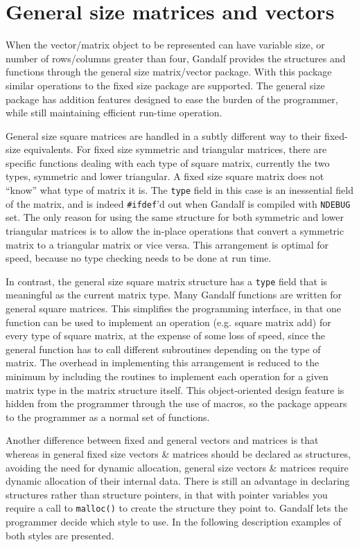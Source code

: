 \section{General size matrices and vectors} \label{general-size-sec}
When the vector/matrix object to be represented can have variable size,
or number of rows/columns greater than four, Gandalf provides the
structures and functions through the general size matrix/vector package.
With this package similar operations to the fixed size package are
supported. The general size package has addition features designed
to ease the burden of the programmer, while still maintaining efficient
run-time operation.

General size square matrices are handled in a subtly different way
to their fixed-size equivalents. For fixed size symmetric and triangular
matrices, there are specific functions dealing with each type of square
matrix, currently the two types, symmetric and lower triangular.
A fixed size square matrix does not ``know'' what type of matrix it is.
The {\tt type} field in this case is an inessential field of the matrix,
and is indeed {\tt \#ifdef}'d out when Gandalf is compiled with {\tt NDEBUG}
set. The only reason for using the same structure for both symmetric
and lower triangular matrices is to allow the in-place operations that convert
a symmetric matrix to a triangular matrix or vice versa. This arrangement
is optimal for speed, because no type checking needs to be done at
run time.

In contrast, the general size square matrix structure has a {\tt type} field
that is meaningful as the current matrix type. Many Gandalf functions are
written for general square matrices. This simplifies the programming interface,
in that one function can be used to implement an operation (e.g. square
matrix add) for every type of square matrix, at the expense of some loss
of speed, since the general function has to call different subroutines
depending on the type of matrix. The overhead in implementing this
arrangement is reduced to the minimum by including the routines to
implement each operation for a given matrix type in the matrix structure
itself. This object-oriented design feature is hidden from the
programmer through the use of macros, so the package appears to the
programmer as a normal set of functions.

Another difference between fixed and general vectors and matrices is that
whereas in general fixed size vectors \& matrices should be declared as
structures, avoiding the need for dynamic allocation,
general size vectors \& matrices require dynamic allocation of their
internal data. There is still an advantage in declaring structures rather
than structure pointers, in that with pointer variables you require a
call to {\tt malloc()} to create the structure they point to.
Gandalf lets the programmer decide which style to use. In the following
description examples of both styles are presented.


